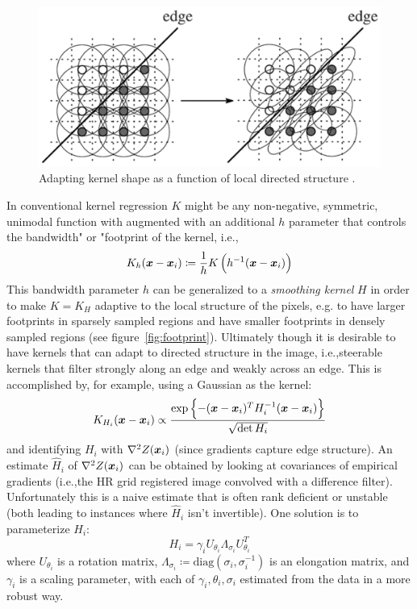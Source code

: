 \begin{figure}[!htbp]
    \centering
    \includegraphics[width=\linewidth,keepaspectratio]{figures/classical/steering.png}
    \caption{Adapting kernel shape as a function of local directed structure \cite{Takeda2007}.}
    \label{fig:steering}
\end{figure}
In conventional kernel regression \(K\) might be any non-negative, symmetric, unimodal \cite{wand1994kernel} function with augmented with an additional \(h\) parameter that controls the bandwidth" or "footprint of the kernel, i.e.,\begin{equation}
    K_h(\bm{x} - \bm{x}_i) \coloneqq \frac{1}{h}K\left( h^{-1}(\bm{x} - \bm{x}_i) \right)
\end{equation}
This bandwidth parameter \(h\) can be generalized to a \textit{smoothing kernel} \(H\) in order to make \(K = K_H\) adaptive to the local structure of the pixels, e.g. to have larger footprints in sparsely sampled regions and have smaller footprints in densely sampled regions (see figure~\ref{fig:footprint}).
%
Ultimately though it is desirable to have kernels that can adapt to directed structure in the image, i.e.,steerable kernels that filter strongly along an edge and weakly across an edge.
%
This is accomplished by, for example, using a Gaussian as the kernel:
\begin{equation}
    K_{H_i}(\bm{x} - \bm{x}_i) \propto \frac{\exp\left\{ -(\bm{x} - \bm{x}_i)^T H^{-1}_i (\bm{x} - \bm{x}_i) \right\}}{\sqrt{\det{H_i}}}
\end{equation}
and identifying \(H_i\) with \(\nabla^2 Z(\bm{x}_i)\) (since gradients capture edge structure).
%
An estimate \(\hat{H}_i\) of \(\nabla^2 Z(\bm{x}_i)\) can be obtained by looking at covariances of empirical gradients (i.e.,the HR grid registered image convolved with a difference filter).
%
Unfortunately this is a naive estimate that is often rank deficient or unstable (both leading to instances where \(\hat{H}_i\) isn't invertible).
%
One solution is to parameterize \(H_i\):
\[
    H_i = \gamma_i U_{\theta_i} \Lambda_{\sigma_i} U_{\theta_i}^T
\]
where \(U_{\theta_i}\) is a rotation matrix, \(\Lambda_{\sigma_i} \coloneqq \text{diag}\left( \sigma_i, \sigma_i^{-1} \right)\) is an elongation matrix, and \(\gamma_i\) is a scaling parameter, with each of \(\gamma_i, \theta_i, \sigma_i\) estimated from the data in a more robust way.
%
